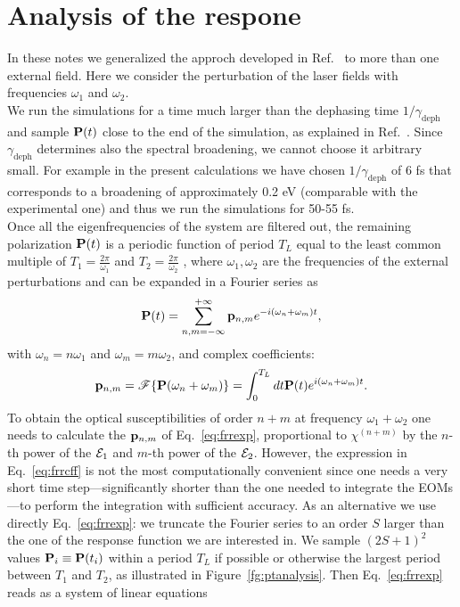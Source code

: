 \documentclass[submission, Phys]{SciPost}
\newcommand{\pp}{{\bf p}}
\newcommand{\PP}{{\bf P}}
\newcommand{\be}{\begin{equation}}
\newcommand{\ee}{\end{equation}}
\renewcommand{\[}{\left[}
\renewcommand{\]}{\right]}
\renewcommand{\(}{\left(}
\renewcommand{\)}{\right)}
\def\efield{\mathbf{\cal E}}
\def\susc#1{\chi^{(#1)}}
\begin{document}
\section{Analysis of the respone}
In these notes we generalized the approch developed in Ref.~\cite{Attaccalite2013} to more than one external field. Here we consider the perturbation of the laser fields with frequencies $\omega_1$ and $\omega_2$.\\
We run the simulations for a time much larger than the dephasing time $1/\gamma_{\text{deph}}$ and sample $\PP(t)$ close to the end of the simulation, as explained in Ref.~\cite{Attaccalite2013}.
Since $\gamma_{\text{deph}}$ determines also the spectral broadening, we cannot choose it arbitrary small. For example in the present calculations we have chosen $1/\gamma_{\text{deph}}$ of 6 fs that corresponds to a broadening of approximately 0.2 eV (comparable with the experimental one) and thus we run the simulations for 50-55 fs.\\
Once all the eigenfrequencies of the system are filtered out, the remaining polarization $\PP(t)$ is a periodic function of period $T_L$ equal to the least common multiple of $T_1=\frac{2\pi}{\omega_1}$ and  $T_2=\frac{2\pi}{\omega_2}$  , where $\omega_1,\omega_2$ are the frequencies of the external perturbations and can be expanded in a Fourier series as
\be\label{eq:frrexp}
\PP(t) = \sum_{n,m=-\infty}^{+\infty} \pp_{n,m} e^{-i(\omega_n+\omega_m) t},
\ee  
with $\omega_n = n \omega_1$ and $\omega_m = m \omega_2$, and complex coefficients:
\begin{equation}\label{eq:frrcff}
	\pp_{n,m}  = \mathscr{F}\{\PP(\omega_n+\omega_m)\} =\int_{0}^{T_L} dt \PP(t) e^{i(\omega_n + \omega_m) t}.
\end{equation}
To obtain the optical susceptibilities of order $n+m$ at frequency $\omega_1+\omega_2$ one needs to calculate the $\pp_{n,m}$ of Eq.~\eqref{eq:frrexp}, proportional to $\susc{n+m}$ by the $n$-th power of the $\efield_1$ and $m$-th power of the $\efield_2$. 
However, the expression in Eq.~\eqref{eq:frrcff} is not the most computationally convenient since one needs a very short time step---significantly shorter than the one needed to integrate the EOMs---to perform the integration with sufficient accuracy. As an alternative we use directly Eq.~\eqref{eq:frrexp}: we truncate the Fourier series to an order $S$ larger than the one of the response function we are interested in. We sample $(2S+1)^2$ values $\PP_i\equiv\PP(t_i)$ within a period $T_L$ if possible or otherwise the largest period between $T_1$ and $T_2$, as illustrated in Figure~\ref{fg:ptanalysis}. Then Eq.~\eqref{eq:frrexp} reads as a system of linear equations 
\end{document}
